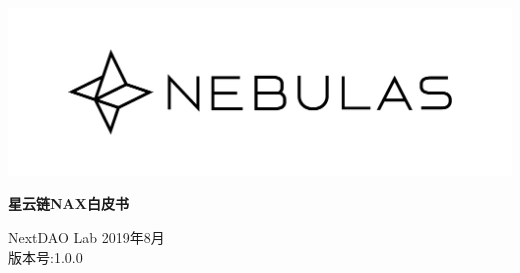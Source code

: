 \documentclass[12pt]{article}
\begin{document}
\pagestyle{empty}
\renewcommand{\contentsname}{目录}
\renewcommand{\abstractname}{摘要}
\renewcommand{\refname}{参考文献}
\renewcommand{\figurename}{图}
\renewcommand{\tablename}{表}
\renewcommand{\baselinestretch}{1.5}
\renewcommand{\appendixname}{附录}
\renewcommand{\proofname}{证明}


\begin{titlepage}
  \begin{center}
    \vspace*{5.5cm}
    \includegraphics[scale=0.4]{../common/Nebulas.png}
    \vspace{0.5cm}


    \textbf{\huge{星云链NAX白皮书}}

    \vspace{0.5cm}
    NextDAO Lab
    \vfill
    2019年8月 \\
    版本号:1.0.0
    \textbf{}
  \end{center}

\end{titlepage}
\setcounter{page}{0}
\tableofcontents
\newpage
\setcounter{page}{1}
\pagestyle{fancy}
\vspace*{0.01cm}
%





\newpage


\newpage 
\begin{appendices}


\end{appendices}
\end{document}
